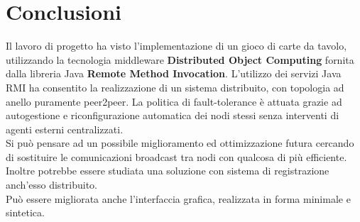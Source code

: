 \documentclass[10pt,a4paper]{article}
\begin{document}
\section{Conclusioni}
Il lavoro di progetto ha visto l'implementazione di un gioco di carte da tavolo, utilizzando la tecnologia middleware \textbf{Distributed Object Computing} fornita dalla libreria Java \textbf{Remote Method Invocation}. L'utilizzo dei servizi Java RMI ha consentito la realizzazione di un sistema distribuito, con topologia ad anello puramente peer2peer. La politica di fault-tolerance è attuata grazie ad autogestione e riconfigurazione automatica dei nodi stessi senza interventi di agenti esterni centralizzati. \\Si può pensare ad un possibile miglioramento ed ottimizzazione futura cercando di sostituire le comunicazioni broadcast tra nodi con qualcosa di più efficiente. Inoltre potrebbe essere studiata una soluzione con sistema di registrazione anch'esso distribuito. \\ Può essere migliorata anche l'interfaccia grafica, realizzata in forma minimale e sintetica.  
\end{document}
